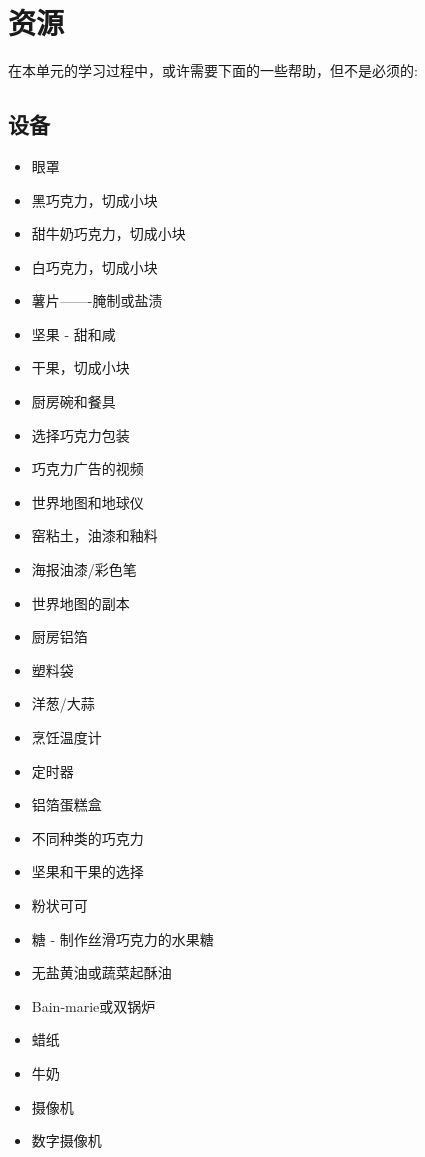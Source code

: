 \chapter{资源}

在本单元的学习过程中，或许需要下面的一些帮助，但不是必须的:\par

\section{设备}

\begin{itemize}
  \item 眼罩
  \item 黑巧克力，切成小块
  \item 甜牛奶巧克力，切成小块
  \item 白巧克力，切成小块
  \item 薯片——-腌制或盐渍
  \item 坚果 - 甜和咸
  \item 干果，切成小块
  \item 厨房碗和餐具
  \item 选择巧克力包装
  \item 巧克力广告的视频
  \item 世界地图和地球仪
  \item 窑粘土，油漆和釉料
  \item 海报油漆/彩色笔
  \item 世界地图的副本
  \item 厨房铝箔
  \item 塑料袋
  \item 洋葱/大蒜
  \item 烹饪温度计 
  \item 定时器
  \item 铝箔蛋糕盒
  \item 不同种类的巧克力
  \item 坚果和干果的选择
  \item 粉状可可
  \item 糖 - 制作丝滑巧克力的水果糖
  \item 无盐黄油或蔬菜起酥油
  \item Bain-marie或双锅炉
  \item 蜡纸
  \item 牛奶
  \item 摄像机
  \item 数字摄像机
\end{itemize}

